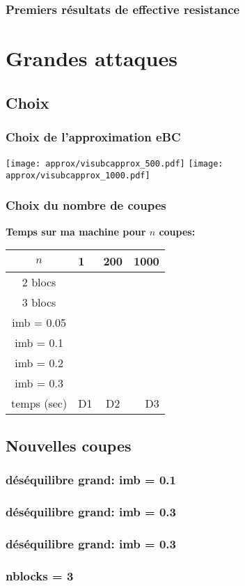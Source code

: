 \documentclass[aspectratio=169]{beamer}
\begin{document}
    \begin{frame}
        \frametitle{Premiers résultats de effective resistance}
    
    \end{frame}
    
    \section{Grandes attaques}
    \subsection{Choix}
    \begin{frame}
        \frametitle{Choix de l'approximation eBC}
        \texttt{[image: approx/visubcapprox\_500.pdf]}
        \texttt{[image: approx/visubcapprox\_1000.pdf]}
    \end{frame}

    \begin{frame}
        \frametitle{Choix du nombre de coupes}
        \textbf{Temps sur ma machine pour $n$ coupes:}\\
        \vspace{5pt}
        \begin{tabular}{|c|l|c|r|} 
            \hline
                $n$ & 1 & 200 & 1000 \\
            \hline
                2 blocs & & &\\
            \hline
                3 blocs & & &\\
            \hline
                imb = 0.05 & & &\\
            \hline
                imb = 0.1 & & &\\
            \hline
                imb = 0.2 & & &\\
            \hline
                imb = 0.3 & & &\\
            \hline
                temps (sec) & D1 & D2 & D3 \\ 
            \hline
            \end{tabular}
    \end{frame}

    \subsection{Nouvelles coupes}
    \begin{frame}
        \frametitle{déséquilibre grand: imb = 0.1}
    
    \end{frame}
    
    \begin{frame}
        \frametitle{déséquilibre grand: imb = 0.3}
    
    \end{frame}
    
    \begin{frame}
        \frametitle{déséquilibre grand: imb = 0.3}
    
    \end{frame}

    \begin{frame}
        \frametitle{nblocks = 3}
    
    \end{frame}
    
    
\end{document}
